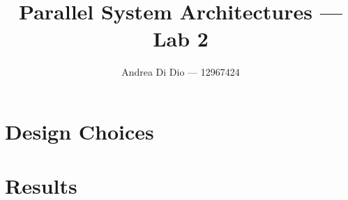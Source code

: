\documentclass[]{article}
\title{Parallel System Architectures --- Lab 2}
\author{Andrea Di Dio --- 12967424}
\begin{document}
\maketitle

\section{Design Choices}

\section{Results}
\end{document}
